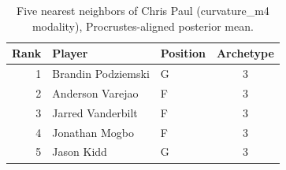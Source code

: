 \begin{table}[htbp]
  \centering\small
  \begin{tabular}{rllc}
    \toprule
    Rank & Player & Position & Archetype \\
    \midrule
    1 & Brandin Podziemski & G & 3 \\
    2 & Anderson Varejao & F & 3 \\
    3 & Jarred Vanderbilt & F & 3 \\
    4 & Jonathan Mogbo & F & 3 \\
    5 & Jason Kidd & G & 3 \\
    \bottomrule
  \end{tabular}
  \caption{Five nearest neighbors of Chris Paul (curvature_m4 modality), Procrustes-aligned posterior mean.}
  \label{tab:Chris_Paul_neighbors_curvature_m4}
\end{table}

